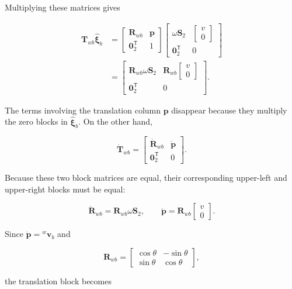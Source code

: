 \documentclass[
  australian,
  12pt,
  letterpaper,
  DIV=11,
  numbers=noendperiod,
  twoside]{scrreprt}
\begin{document}
Multiplying these matrices gives

\[
\begin{aligned}
\mathbf T_{wb}\widehat{\boldsymbol\xi}_b
&=
\begin{bmatrix}
\mathbf R_{wb}&\mathbf p\\
\mathbf 0_2^\mathsf T&1
\end{bmatrix}
\begin{bmatrix}
\omega\mathbf S_2&
\begin{bmatrix}
v\\0
\end{bmatrix}\\
\mathbf 0_2^\mathsf T&0
\end{bmatrix}\\
&=
\begin{bmatrix}
\mathbf R_{wb}\omega\mathbf S_2&
\mathbf R_{wb}
\begin{bmatrix}
v\\0
\end{bmatrix}\\
\mathbf 0_2^\mathsf T&0
\end{bmatrix}.
\end{aligned}
\]

The terms involving the translation column \(\mathbf p\) disappear
because they multiply the zero blocks in \(\widehat{\boldsymbol\xi}_b\).
On the other hand,

\[
\dot{\mathbf T}_{wb}
=
\begin{bmatrix}
\dot{\mathbf R}_{wb}&\dot{\mathbf p}\\
\mathbf 0_2^\mathsf T&0
\end{bmatrix}.
\]

Because these two block matrices are equal, their corresponding
upper-left and upper-right blocks must be equal:

\[
\dot{\mathbf R}_{wb}
=
\mathbf R_{wb}\omega\mathbf S_2,
\qquad
\dot{\mathbf p}
=
\mathbf R_{wb}
\begin{bmatrix}
v\\0
\end{bmatrix}.
\]

Since \(\dot{\mathbf p}={}^w\mathbf v_b\) and

\[
\mathbf R_{wb}
=
\begin{bmatrix}
\cos\theta&-\sin\theta\\
\sin\theta&\cos\theta
\end{bmatrix},
\]

the translation block becomes
\end{document}

